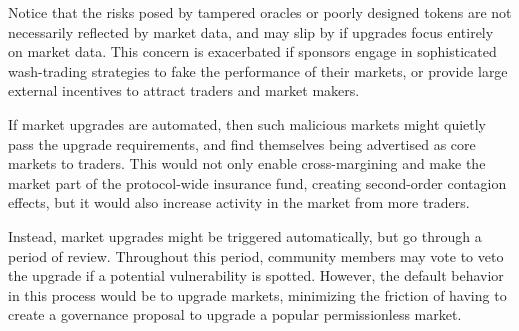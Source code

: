             Notice that the risks posed by tampered oracles or poorly designed tokens are not necessarily reflected by market data, and may slip by if upgrades focus entirely on market data. This concern is exacerbated if sponsors engage in sophisticated wash-trading strategies to fake the performance of their markets, or provide large external incentives to attract traders and market makers. 
            
            If market upgrades are automated, then such malicious markets might quietly pass the upgrade requirements, and find themselves being advertised as core markets to traders. This would not only enable cross-margining and make the market part of the protocol-wide insurance fund, creating second-order contagion effects, but it would also increase activity in the market from more traders. 

            Instead, market upgrades might be triggered automatically, but go through a period of review. Throughout this period, community members may vote to veto the upgrade if a potential vulnerability is spotted. However, the default behavior in this process would be to upgrade markets, minimizing the friction of having to create a governance proposal to upgrade a popular permissionless market. 


    

